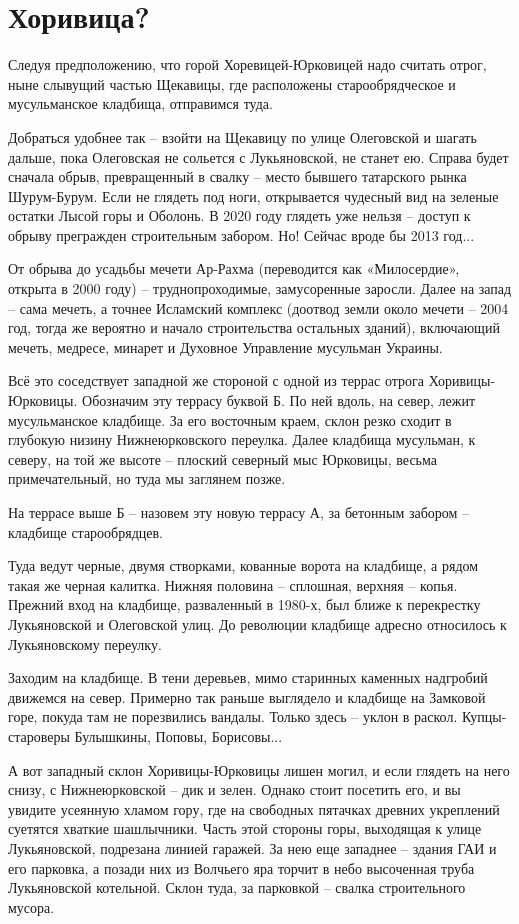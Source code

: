 \chapter{Хоривица?}

Следуя предположению, что горой Хоревицей-Юрковицей надо считать отрог, ныне слывущий частью Щекавицы, где расположены старообрядческое и мусульманское кладбища, отправимся туда. 

Добраться удобнее так – взойти на Щекавицу по улице Олеговской и шагать дальше, пока Олеговская не сольется с Лукьяновской, не станет ею. Справа будет сначала обрыв, превращенный в свалку – место бывшего татарского рынка Шурум-Бурум. Если не глядеть под ноги, открывается чудесный вид на зеленые остатки Лысой горы и Оболонь. В 2020 году глядеть уже нельзя – доступ к обрыву прегражден строительным забором. Но! Сейчас вроде бы 2013 год...

От обрыва до усадьбы мечети Ар-Рахма (переводится как «Милосердие», открыта в 2000 году) – труднопроходимые, замусоренные заросли. Далее на запад – сама мечеть, а точнее Исламский комплекс (доотвод земли около мечети – 2004 год, тогда же вероятно и начало строительства остальных зданий), включающий мечеть, медресе, минарет и Духовное Управление мусульман Украины.

Всё это соседствует западной же стороной с одной из террас отрога Хоривицы-Юрковицы. Обозначим эту террасу буквой Б. По ней вдоль, на север, лежит мусульманское кладбище. За его восточным краем, склон резко сходит в глубокую низину Нижнеюрковского переулка. Далее кладбища мусульман, к северу, на той же высоте – плоский северный мыс Юрковицы, весьма примечательный, но туда мы заглянем позже.

На террасе выше Б – назовем эту новую террасу А, за бетонным забором – кладбище старообрядцев.

Туда ведут черные, двумя створками, кованные ворота на кладбище, а рядом такая же черная калитка. Нижняя половина – сплошная, верхняя – копья. Прежний вход на кладбище, разваленный в 1980-х, был ближе к перекрестку Лукьяновской и Олеговской улиц. До революции кладбище адресно относилось к Лукьяновскому переулку.

Заходим на кладбище. В тени деревьев, мимо старинных каменных надгробий движемся на север. Примерно так раньше выглядело и кладбище на Замковой горе, покуда там не порезвились вандалы. Только здесь – уклон в раскол. Купцы-староверы Булышкины, Поповы, Борисовы...

А вот западный склон Хоривицы-Юрковицы лишен могил, и если глядеть на него снизу, с Нижнеюрковской – дик и зелен. Однако стоит посетить его, и вы увидите усеянную хламом гору, где на свободных пятачках древних укреплений суетятся хваткие шашлычники. Часть этой стороны горы, выходящая к улице Лукьяновской, подрезана линией гаражей. За нею еще западнее – здания ГАИ и его парковка, а позади них из Волчьего яра торчит в небо высоченная труба Лукьяновской котельной. Склон туда, за парковкой – свалка строительного мусора.

